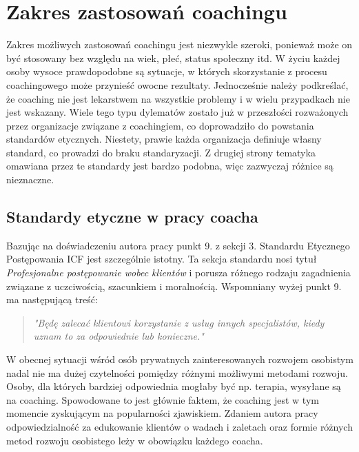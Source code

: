 
\section{Zakres zastosowań coachingu}


Zakres możliwych zastosowań coachingu jest niezwykle szeroki, ponieważ może on być stosowany bez względu na wiek, płeć, status społeczny itd.
W życiu każdej osoby wysoce prawdopodobne są sytuacje, w których skorzystanie z procesu coachingowego może przynieść owocne rezultaty.
Jednocześnie należy podkreślać, że coaching nie jest lekarstwem na wszystkie problemy i w wielu przypadkach nie jest wskazany.
Wiele tego typu dylematów zostało już w przeszłości rozważonych przez organizacje związane z coachingiem, co doprowadziło do powstania
standardów etycznych. Niestety, prawie każda organizacja definiuje własny standard, co prowadzi do braku standaryzacji. Z drugiej strony
tematyka omawiana przez te standardy jest bardzo podobna, więc zazwyczaj różnice są nieznaczne.

\subsection{Standardy etyczne w pracy coacha}
Bazując na doświadczeniu autora pracy punkt 9. z sekcji 3. Standardu Etycznego Postępowania ICF \cite{kodeksicf} jest szczególnie istotny.
Ta sekcja standardu nosi tytuł \emph{Profesjonalne postępowanie wobec klientów} i porusza różnego rodzaju zagadnienia związane
z uczciwością, szacunkiem i moralnością. Wspomniany wyżej punkt 9. ma następującą treść:
\begin{quote}
\centering
\emph{ "Będę zalecać klientowi korzystanie z usług innych specjalistów, kiedy uznam to za odpowiednie lub konieczne."}
\end{quote}
W obecnej sytuacji wśród osób prywatnych zainteresowanych rozwojem osobistym nadal nie ma dużej czytelności pomiędzy różnymi
możliwymi metodami rozwoju. Osoby, dla których bardziej odpowiednia mogłaby być np. terapia, wysyłane są na coaching. Spowodowane
to jest głównie faktem, że coaching jest w tym momencie zyskującym na popularności zjawiskiem. Zdaniem autora pracy odpowiedzialność
za edukowanie klientów o wadach i zaletach oraz formie różnych metod rozwoju osobistego leży w obowiązku każdego coacha.

